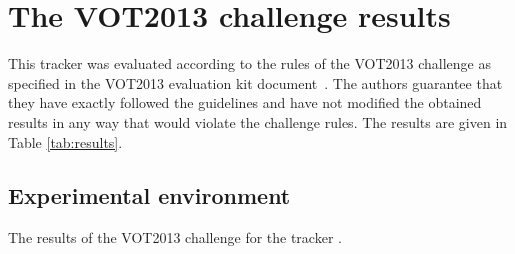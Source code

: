 \documentclass[10pt,oneside]{article}
\begin{document}
\section{The VOT2013 challenge results}
This tracker was evaluated according to the rules of the VOT2013 challenge
as specified in the VOT2013 evaluation kit document~\cite{VOT2013}.
The authors guarantee that they have exactly followed the guidelines
and have not modified the obtained results in any way that would violate the challenge rules.
The results are given in Table \ref{tab:results}.

\subsection{Experimental environment}

\begin{table}[h]
    \caption{The results of the VOT2013 challenge for the tracker
      .}
      \label{tab:results}

    \end{table}
    {\small
      
      
    }

    
\end{document}
